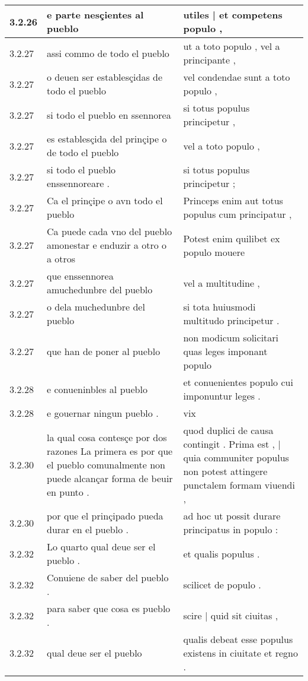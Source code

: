 \begin{tabular}{|p{1cm}|p{6.5cm}|p{6.5cm}|}
3.2.26 & e parte nesçientes al pueblo & utiles | et competens populo , \\\hline
3.2.27 & assi commo de todo el pueblo & ut a toto populo , vel a principante , \\\hline
3.2.27 & o deuen ser establesçidas de todo el pueblo & vel condendae sunt a toto populo , \\\hline
3.2.27 & si todo el pueblo en ssennorea & si totus populus principetur , \\\hline
3.2.27 & es establesçida del prinçipe o de todo el pueblo & vel a toto populo , \\\hline
3.2.27 & si todo el pueblo enssennoreare . & si totus populus principetur ; \\\hline
3.2.27 & Ca el prinçipe o avn todo el pueblo & Princeps enim aut totus populus cum principatur , \\\hline
3.2.27 & Ca puede cada vno del pueblo amonestar e enduzir a otro o a otros & Potest enim quilibet ex populo mouere \\\hline
3.2.27 & que enssennorea amuchedunbre del pueblo & vel a multitudine , \\\hline
3.2.27 & o dela muchedunbre del pueblo & si tota huiusmodi multitudo principetur . \\\hline
3.2.27 & que han de poner al pueblo & non modicum solicitari quas leges imponant populo \\\hline
3.2.28 & e conueninbles al pueblo & et conuenientes populo cui imponuntur leges . \\\hline
3.2.28 & e gouernar ningun pueblo . & vix \\\hline
3.2.30 & la qual cosa contesçe por dos razones La primera es por que el pueblo comunalmente non puede alcançar forma de beuir en punto . & quod duplici de causa contingit . Prima est , | quia communiter populus non potest attingere punctalem formam viuendi , \\\hline
3.2.30 & por que el prinçipado pueda durar en el pueblo . & ad hoc ut possit durare principatus in populo : \\\hline
3.2.32 & Lo quarto qual deue ser el pueblo . & et qualis populus . \\\hline
3.2.32 & Conuiene de saber del pueblo . & scilicet de populo . \\\hline
3.2.32 & para saber que cosa es pueblo . & scire | quid sit ciuitas , \\\hline
3.2.32 & qual deue ser el pueblo & qualis debeat esse populus existens in ciuitate et regno . \\\hline

\end{tabular}
